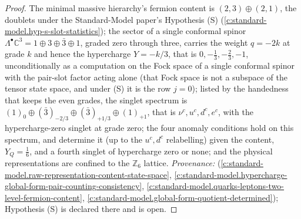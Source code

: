 \documentclass[11pt]{article}
\theoremstyle{definition}
\theoremstyle{plain}
\providecommand{\C}{}\renewcommand{\C}{\mathbb{C}}
\begin{document}
\begin{proof}
The minimal massive hierarchy's fermion content is $(2,3) \oplus (2,1)$, the doublets under the Standard-Model paper's Hypothesis (S) (\ref{c:standard-model.hyp-s-slot-statistics}); the sector of a single conformal spinor $\Lambda^{\bullet}\C^{3} = 1 \oplus 3 \oplus \bar{3} \oplus 1$, graded zero through three, carries the weight $q = -2k$ at grade $k$ and hence the hypercharge $Y = -k/3$, that is $0, -\tfrac13, -\tfrac23, -1$, unconditionally as a computation on the Fock space of a single conformal spinor with the pair-slot factor acting alone (that Fock space is not a subspace of the tensor state space, and under (S) it is the row $j = 0$); listed by the handedness that keeps the even grades, the singlet spectrum is $(1)_{0} \oplus (\bar{3})_{-2/3} \oplus (\bar{3})_{+1/3} \oplus (1)_{+1}$, that is $\nu^{c}, u^{c}, d^{c}, e^{c}$, with the hypercharge-zero singlet at grade zero; the four anomaly conditions hold on this spectrum, and determine it (up to the $u^{c}, d^{c}$ relabelling) given the content, $Y_{Q} = \tfrac16$, and a fourth singlet of hypercharge zero or none; and the physical representations are confined to the $\mathbb{Z}_{6}$ lattice. \emph{Provenance:} \cite[Prop.~5.1, Prop.~5.3, Thm.~5.5, Thm.~4.2]{ButlerT12} (\ref{c:standard-model.raw-representation-content-state-space}, \ref{c:standard-model.hypercharge-global-form-pair-counting-consistency}, \ref{c:standard-model.quarks-leptons-two-level-fermion-content}, \ref{c:standard-model.global-form-quotient-determined}); Hypothesis (S) is declared there and is open.

\end{proof}
\end{document}
